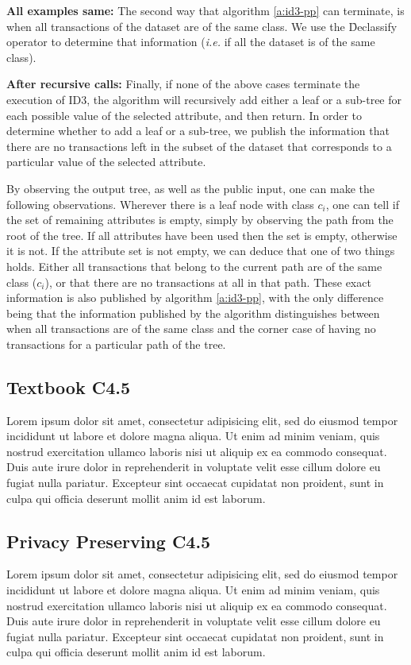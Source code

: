 \textbf{All examples same:}
The second way that algorithm \ref{a:id3-pp} can terminate, is when all transactions of the dataset are of the same class.
We use the \f{Declassify} operator to determine that information (\textit{i.e.} if all the dataset is of the same class).

\textbf{After recursive calls:}
Finally, if none of the above cases terminate the execution of ID3, the algorithm will recursively add either a leaf or a sub\hyp tree for each possible value of the selected attribute, and then return.
In order to determine whether to add a leaf or a sub\hyp tree, we publish the information that there are no transactions left in the subset of the dataset that corresponds to a particular value of the selected attribute.

By observing the output tree, as well as the public input, one can make the following observations.
Wherever there is a leaf node with class $c_i$, one can tell if the set of remaining attributes is empty, simply by observing the path from the root of the tree.
If all attributes have been used then the set is empty, otherwise it is not.
If the attribute set is not empty, we can deduce that one of two things holds.
Either all transactions that belong to the current path are of the same class ($c_i$), or that there are no transactions at all in that path.
These exact information is also published by algorithm \ref{a:id3-pp}, with the only difference being that the information published by the algorithm distinguishes between when all transactions are of the same class and the corner case of having no transactions for a particular path of the tree.



\subsection{Textbook C4.5}\label{s:c45}
Lorem ipsum dolor sit amet, consectetur adipisicing elit, sed do eiusmod tempor incididunt ut labore et dolore magna aliqua. Ut enim ad minim veniam, quis nostrud exercitation ullamco laboris nisi ut aliquip ex ea commodo consequat. Duis aute irure dolor in reprehenderit in voluptate velit esse cillum dolore eu fugiat nulla pariatur. Excepteur sint occaecat cupidatat non proident, sunt in culpa qui officia deserunt mollit anim id est laborum.

\subsection{Privacy Preserving C4.5}\label{s:pp-c45}
Lorem ipsum dolor sit amet, consectetur adipisicing elit, sed do eiusmod tempor incididunt ut labore et dolore magna aliqua. Ut enim ad minim veniam, quis nostrud exercitation ullamco laboris nisi ut aliquip ex ea commodo consequat. Duis aute irure dolor in reprehenderit in voluptate velit esse cillum dolore eu fugiat nulla pariatur. Excepteur sint occaecat cupidatat non proident, sunt in culpa qui officia deserunt mollit anim id est laborum.


